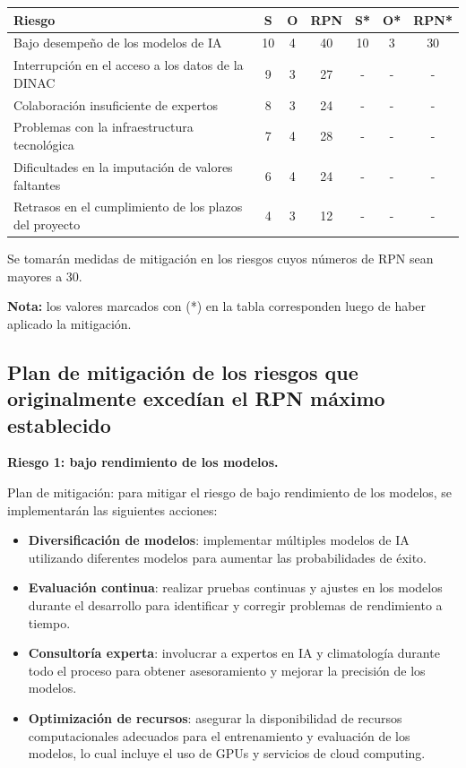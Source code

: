 \documentclass[
11pt, %
codirector, %
]{charter}
\begin{document}
\begin{table}[htpb]
\centering
\begin{tabularx}{\linewidth}{@{}|X|c|c|c|c|c|c|@{}}
\hline
\rowcolor[HTML]{C0C0C0} 
Riesgo & S & O & RPN & S* & O* & RPN* \\ \hline
Bajo desempeño de los modelos de IA & 10 & 4 & 40 & 10 & 3 & 30 \\ \hline
Interrupción en el acceso a los datos de la DINAC & 9 & 3 & 27 & - & - & - \\ \hline
Colaboración insuficiente de expertos & 8 & 3 & 24 & - & - & - \\ \hline
Problemas con la infraestructura tecnológica & 7 & 4 & 28 & - & - & - \\ \hline
Dificultades en la imputación de valores faltantes & 6 & 4 & 24 & - & - & - \\ \hline
Retrasos en el cumplimiento de los plazos del proyecto & 4 & 3 & 12 & - & - & - \\ \hline
\end{tabularx}%
\end{table}

Se tomarán medidas de mitigación en los riesgos cuyos números de RPN sean mayores a 30.

\textbf{Nota:} los valores marcados con (*) en la tabla corresponden luego de haber aplicado la mitigación.

\subsection{Plan de mitigación de los riesgos que originalmente excedían el RPN máximo establecido}

\textbf{Riesgo 1: bajo rendimiento de los modelos.}

Plan de mitigación: para mitigar el riesgo de bajo rendimiento de los modelos, se implementarán las siguientes acciones:
\begin{itemize}
    \item \textbf{Diversificación de modelos}: implementar múltiples modelos de IA utilizando diferentes modelos para aumentar las probabilidades de éxito.
    \item \textbf{Evaluación continua}: realizar pruebas continuas y ajustes en los modelos durante el desarrollo para identificar y corregir problemas de rendimiento a tiempo.
    \item \textbf{Consultoría experta}: involucrar a expertos en IA y climatología durante todo el proceso para obtener asesoramiento y mejorar la precisión de los modelos.
    \item \textbf{Optimización de recursos}: asegurar la disponibilidad de recursos computacionales adecuados para el entrenamiento y evaluación de los modelos, lo cual incluye el uso de GPUs y servicios de cloud computing.
\end{itemize}
\end{document}

